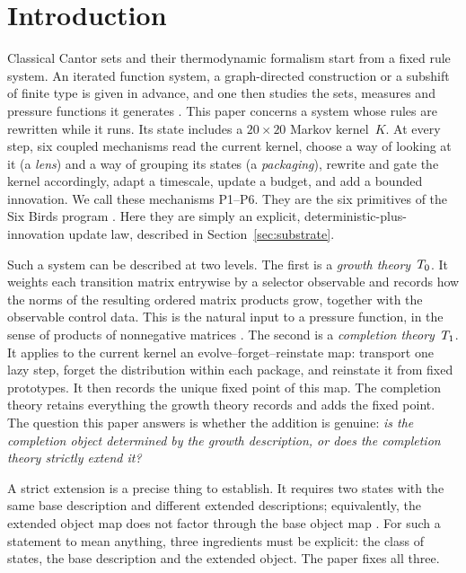 \section{Introduction}\label{sec:introduction}

Classical Cantor sets and their thermodynamic formalism start from a fixed rule system. An iterated function system, a graph-directed construction or a subshift of finite type is given in advance, and one then studies the sets, measures and pressure functions it generates \cite{Hutchinson1981Fractals,Moran1946AdditiveFunctions,MauldinUrbanskiGDMS,FalconerFractalGeometry,Bowen1979Quasicircles,Ruelle1978ThermodynamicFormalism,WaltersErgodic1982}. This paper concerns a system whose rules are rewritten while it runs. Its state includes a $20\times 20$ Markov kernel~$K$. At every step, six coupled mechanisms read the current kernel, choose a way of looking at it (a \emph{lens}) and a way of grouping its states (a \emph{packaging}), rewrite and gate the kernel accordingly, adapt a timescale, update a budget, and add a bounded innovation. We call these mechanisms P1--P6. They are the six primitives of the Six Birds program \cite{TsiokosFoundations}. Here they are simply an explicit, deterministic-plus-innovation update law, described in Section~\ref{sec:substrate}.

Such a system can be described at two levels. The first is a \emph{growth theory}~$T_0$. It weights each transition matrix entrywise by a selector observable and records how the norms of the resulting ordered matrix products grow, together with the observable control data. This is the natural input to a pressure function, in the sense of products of nonnegative matrices \cite{FengLau2002MatrixPressure,CaoFengHuang2008SubAdditive}. The second is a \emph{completion theory}~$T_1$. It applies to the current kernel an evolve--forget--reinstate map: transport one lazy step, forget the distribution within each package, and reinstate it from fixed prototypes. It then records the unique fixed point of this map. The completion theory retains everything the growth theory records and adds the fixed point. The question this paper answers is whether the addition is genuine: \emph{is the completion object determined by the growth description, or does the completion theory strictly extend it?}

A strict extension is a precise thing to establish. It requires two states with the same base description and different extended descriptions; equivalently, the extended object map does not factor through the base object map \cite{LindMarcus1995SymbolicDynamics,TsiokosFoundations}. For such a statement to mean anything, three ingredients must be explicit: the class of states, the base description and the extended object. The paper fixes all three.

